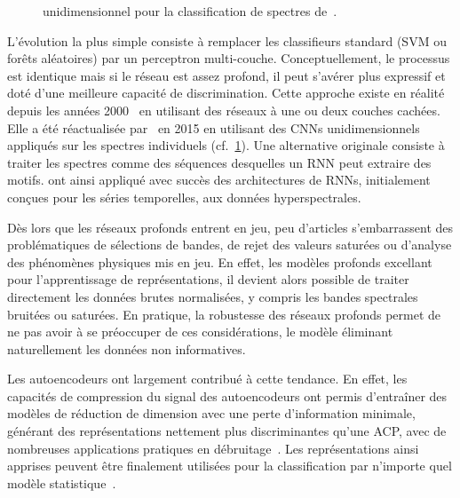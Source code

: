 \begin{figure}[h]
  \resizebox{\textwidth}{!}{}
  \caption[ unidimensionnel pour la classification de spectres.]{ unidimensionnel pour la classification de spectres de~\citet{hu_deep_2015}.}
  \label{fig:cnn1d_hsi}
\end{figure}

L'évolution la plus simple consiste à remplacer les classifieurs standard (\gls{SVM} ou forêts aléatoires) par un perceptron multi-couche. Conceptuellement, le processus est identique mais si le réseau est assez profond, il peut s'avérer plus expressif et doté d'une meilleure capacité de discrimination. Cette approche existe en réalité depuis les années 2000~\cite{goel_classification_2003,ratle_semisupervised_2010} en utilisant des réseaux à une ou deux couches cachées. Elle a été réactualisée par~\citet{hu_deep_2015} en 2015 en utilisant des \glspl{CNN} unidimensionnels appliqués sur les spectres individuels (cf.~\cref{fig:cnn1d_hsi}). Une alternative originale consiste à traiter les spectres comme des séquences desquelles un \gls{RNN} peut extraire des motifs. \citet{mou_deep_2017} ont ainsi appliqué avec succès des architectures de \glspl{RNN}, initialement conçues pour les séries temporelles, aux données hyperspectrales.

Dès lors que les réseaux profonds entrent en jeu, peu d'articles s'embarrassent des problématiques de sélections de bandes, de rejet des valeurs saturées ou d'analyse des phénomènes physiques mis en jeu. En effet, les modèles profonds excellant pour l'apprentissage de représentations, il devient alors possible de traiter directement les données brutes normalisées, y compris les bandes spectrales bruitées ou saturées. En pratique, la robustesse des réseaux profonds permet de ne pas avoir à se préoccuper de ces considérations, le modèle éliminant naturellement les données non informatives.

Les autoencodeurs ont largement contribué à cette tendance. En effet, les capacités de compression du signal des autoencodeurs ont permis d'entraîner des modèles de réduction de dimension avec une perte d'information minimale, générant des représentations nettement plus discriminantes qu'une \gls{ACP}, avec de nombreuses applications pratiques en débruitage~\cite{xing_stacked_2015}. Les représentations ainsi apprises peuvent être finalement utilisées pour la classification par n'importe quel modèle statistique~\cite{fu_semi-supervised_2016}.

